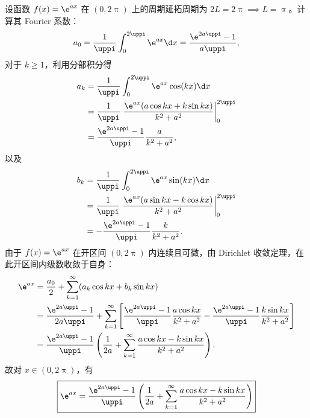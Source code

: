 \begin{myproof}
    设函数 $f(x) = \e^{ax}$ 在 $(0, 2\uppi)$ 上的周期延拓周期为 $2L = 2\uppi \implies L = \uppi$。计算其 Fourier 系数：
    \begin{equation}\label{eq:exp-a0-val}
        a_0 = \frac{1}{\uppi} \int_{0}^{2\uppi} \e^{ax} \d x = \frac{\e^{2a\uppi} - 1}{a\uppi},
    \end{equation}
    对于 $k \geqslant 1$，利用分部积分得
    \begin{equation}\label{eq:exp-ak-val}
        \begin{aligned}
            a_k & = \frac{1}{\uppi} \int_{0}^{2\uppi} \e^{ax} \cos(kx) \d x                                      \\
                & = \frac{1}{\uppi} \left. \frac{\e^{ax}(a \cos kx + k \sin kx)}{k^2 + a^2} \right|_{0}^{2\uppi} \\
                & = \frac{\e^{2a\uppi} - 1}{\uppi} \frac{a}{k^2 + a^2},
        \end{aligned}
    \end{equation}
    以及
    \begin{equation}\label{eq:exp-bk-val}
        \begin{aligned}
            b_k & = \frac{1}{\uppi} \int_{0}^{2\uppi} \e^{ax} \sin(kx) \d x                                      \\
                & = \frac{1}{\uppi} \left. \frac{\e^{ax}(a \sin kx - k \cos kx)}{k^2 + a^2} \right|_{0}^{2\uppi} \\
                & = -\frac{\e^{2a\uppi} - 1}{\uppi} \frac{k}{k^2 + a^2}.
        \end{aligned}
    \end{equation}
    由于 $f(x) = \e^{ax}$ 在开区间 $(0, 2\uppi)$ 内连续且可微，由 Dirichlet 收敛定理，在此开区间内级数收敛于自身：
    \begin{equation}\label{eq:exp-sum}
        \begin{aligned}
            \e^{ax} & = \frac{a_0}{2} + \sum_{k=1}^{\infty} (a_k \cos kx + b_k \sin kx)                                                                                                                               \\
                    & = \frac{\e^{2a\uppi} - 1}{2a\uppi} + \sum_{k=1}^{\infty} \left[ \frac{\e^{2a\uppi} - 1}{\uppi} \frac{a \cos kx}{k^2 + a^2} - \frac{\e^{2a\uppi} - 1}{\uppi} \frac{k \sin kx}{k^2 + a^2} \right] \\
                    & = \frac{\e^{2a\uppi} - 1}{\uppi} \left( \frac{1}{2a} + \sum_{k=1}^{\infty} \frac{a \cos kx - k \sin kx}{k^2 + a^2} \right).
        \end{aligned}
    \end{equation}
    故对 $x \in (0, 2\uppi)$，有
    \begin{equation}
        \boxed{\e^{ax} = \frac{\e^{2a\uppi} - 1}{\uppi} \left( \frac{1}{2a} + \sum_{k=1}^{\infty} \frac{a \cos kx - k \sin kx}{k^2 + a^2} \right)}
    \end{equation}
\end{myproof}

